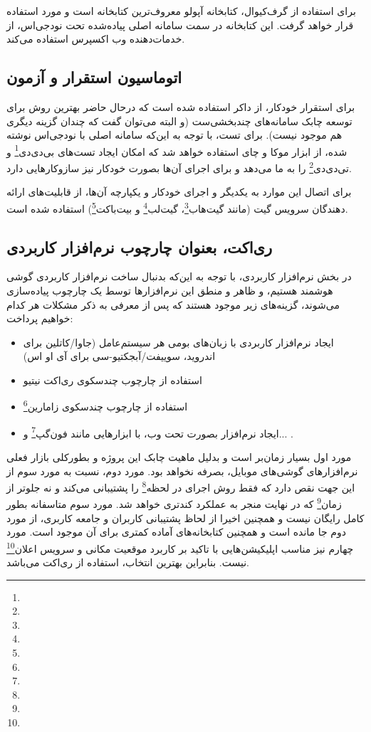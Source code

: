 برای استفاده از گرف‌کیوال، کتابخانه آپولو معروف‌ترین کتابخانه است و مورد استفاده قرار خواهد گرفت. این کتابخانه در سمت سامانه اصلی پیاده‌شده تحت نودجی‌اس، از خدمات‌دهنده وب اکسپرس استفاده می‌کند.\cite{apollo}

\subsection{اتوماسیون استقرار و آزمون}

برای استقرار خودکار، از داکر استفاده شده است که درحال حاضر بهترین روش برای توسعه چابک سامانه‌های چندبخشی‌ست (و البته می‌توان گفت که چندان گزینه دیگری هم موجود نیست). برای تست، با توجه به این‌که سامانه اصلی با نودجی‌اس نوشته شده، از ابزار موکا و چای استفاده خواهد شد که امکان ایجاد تست‌های بی‌دی‌دی\footnote{} و تی‌دی‌دی\footnote{} را به ما می‌دهد و برای اجرای آن‌ها بصورت خودکار نیز سازوکارهایی دارد.

برای اتصال این موارد به یکدیگر و اجرای خودکار و یکپارچه آن‌ها، از قابلیت‌های  ارائه دهندگان سرویس گیت (مانند گیت‌هاب\footnote{}، گیت‌لب\footnote{} و بیت‌باکت\footnote{}) استفاده شده است.

\newpage

\subsection{ری‌اکت، بعنوان چارچوب نرم‌افزار کاربردی}

در بخش نرم‌افزار کاربردی، با توجه به این‌که بدنبال ساخت نرم‌افزار کاربردی گوشی هوشمند هستیم، و ظاهر و منطق این نرم‌افزارها توسط یک چارچوب پیاده‌سازی می‌شوند، گزینه‌های زیر موجود هستند که پس از معرفی به ذکر مشکلات هر کدام خواهیم پرداخت:

\begin{itemize}
	\item ایجاد نرم‌افزار کاربردی با زبان‌های بومی هر سیستم‌عامل (جاوا/کاتلین برای اندروید، سوییفت/آبجکتیو-سی برای آی او اس)
	\item استفاده از چارچوب چندسکوی ری‌اکت نیتیو
	\item استفاده از چارچوب چندسکوی زامارین\footnote{}
	\item ایجاد نرم‌افزار بصورت تحت وب، با ابزارهایی مانند فون‌گپ\footnote{} و... .
\end{itemize}

مورد اول بسیار زمان‌بر است و بدلیل ماهیت چابک این پروژه و بطورکلی بازار فعلی نرم‌افزارهای گوشی‌های موبایل، بصرفه نخواهد بود. مورد دوم، نسبت به مورد سوم از این جهت نقص دارد که فقط روش اجرای در لحظه\footnote{} را پشتیبانی می‌کند و نه جلوتر از زمان\footnote{} که در نهایت منجر به عملکرد کندتری خواهد شد. مورد سوم متاسفانه بطور کامل رایگان نیست و همچنین اخیرا از لحاظ پشتیبانی کاربران و جامعه کاربری، از مورد دوم جا مانده است و همچنین کتابخانه‌های آماده کمتری برای آن موجود است. مورد چهارم نیز مناسب اپلیکیشن‌هایی با تاکید بر کاربرد موقعیت مکانی و سرویس اعلان\footnote{} نیست. بنابراین بهترین انتخاب، استفاده از ری‌اکت می‌باشد.

